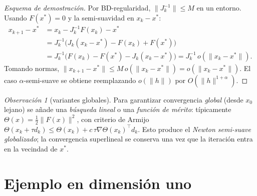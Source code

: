 \documentclass[12pt]{book}
\theoremstyle{definition}
\theoremstyle{plain}
\theoremstyle{remark}
\newtheorem{observacion}{Observación}[section]
\begin{document}
\begin{proof}[Esquema de demostración]
  Por BD-regularidad, $\|J_k^{-1}\|\le M$ en un entorno.  Usando
  $F(x^*)=0$ y la semi-suavidad en $x_k-x^*$:
  \begin{align*}
    x_{k+1}-x^*
    &= x_k - J_k^{-1}F(x_k) - x^*\\
    &= J_k^{-1}\bigl(J_k(x_k-x^*) - F(x_k)+F(x^*)\bigr)\\
    &= J_k^{-1}\bigl(F(x_k)-F(x^*)-J_k(x_k-x^*)\bigr)
     = J_k^{-1}\,o(\|x_k-x^*\|).
  \end{align*}
  Tomando normas, $\|x_{k+1}-x^*\|\le M\,o(\|x_k-x^*\|)
  =o(\|x_k-x^*\|)$.  El caso $\alpha$-semi-suave se obtiene
  reemplazando $o(\|h\|)$ por $O(\|h\|^{1+\alpha})$.
\end{proof}

\begin{observacion}[variantes globales]
  Para garantizar convergencia \emph{global} (desde $x_0$ lejano)
  se añade una \emph{búsqueda lineal} o una \emph{función de
  mérito}: típicamente $\Theta(x)=\tfrac12\|F(x)\|^2$, con criterio
  de Armijo
  $\Theta(x_k+\tau d_k)\le\Theta(x_k)+c\,\tau\nabla\Theta(x_k)^{\!\top}d_k$.
  Esto produce el \emph{Newton semi-suave globalizado}; la
  convergencia superlineal se conserva una vez que la iteración
  entra en la vecindad de $x^*$.
\end{observacion}

\section{Ejemplo en dimensión uno}\label{sec:1d}
\end{document}
